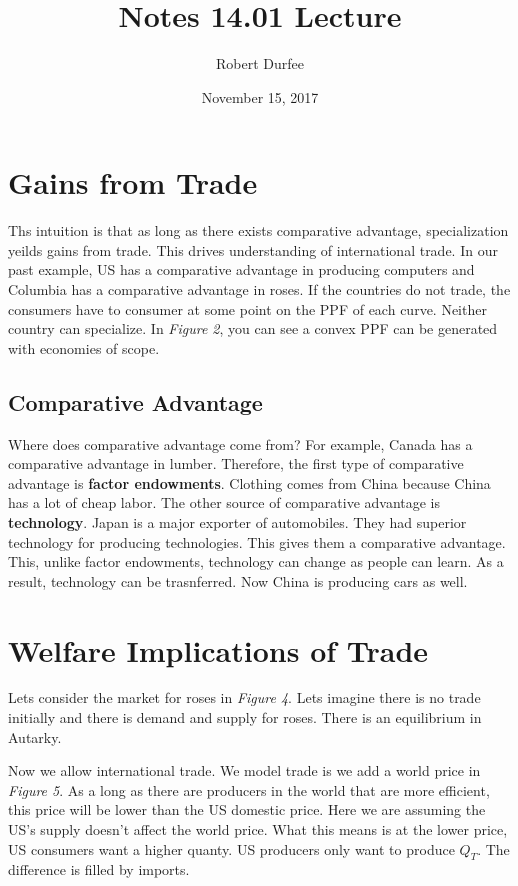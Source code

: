 \documentclass{article}
\title{ Notes 14.01 Lecture }
\author{ Robert Durfee }
\date{ November 15, 2017 }
\begin{document}
\maketitle

\section{ Gains from Trade }

Ths intuition is that as long as there exists comparative advantage,
specialization yeilds gains from trade. This drives understanding of
international trade. In our past example, US has a comparative advantage in
producing computers and Columbia has a comparative advantage in roses. If the
countries do not trade, the consumers have to consumer at some point on the PPF
of each curve. Neither country can specialize. In \textit{Figure 2}, you can see
a convex PPF can be generated with economies of scope.

\subsection{Comparative Advantage}

Where does comparative advantage come from? For example, Canada has a
comparative advantage in lumber. Therefore, the first type of comparative
advantage is \textbf{factor endowments}. Clothing comes from China because China
has a lot of cheap labor. The other source of comparative advantage is
\textbf{technology}. Japan is a major exporter of automobiles. They had
superior technology for producing technologies. This gives them a comparative
advantage. This, unlike factor endowments, technology can change as people can
learn. As a result, technology can be trasnferred. Now China is producing cars
as well.

\section{Welfare Implications of Trade}

Lets consider the market for roses in \textit{Figure 4}. Lets imagine there is
no trade initially and there is demand and supply for roses. There is an
equilibrium in Autarky. 

Now we allow international trade. We model trade is we add a world price in
\textit{Figure 5}. As a long as there are producers in the world that are more
efficient, this price will be lower than the US domestic price. Here we are assuming
the US's supply doesn't affect the world price. What this means is at the lower
price, US consumers want a higher quanty. US producers only want to produce
$Q_T$. The difference is filled by imports. 
\end{document}
